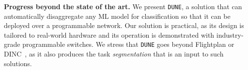 \documentclass[journal]{IEEEtran}
\theoremstyle{plain} %
\newcommand{\eg}{\textit{e.g.},\xspace}
\newcommand{\name}{\texttt{\fontsize{9}{11}\selectfont DUNE}\xspace}
\begin{document}
\noindent\textbf{Progress beyond the state of the art.}
We present \name, a solution that can automatically disaggregate any ML model for classification so that it can be deployed over a programmable network. Our solution is practical, as its design is tailored to real-world hardware and its operation is demonstrated with industry-grade programmable switches. We stress that \name goes beyond Flightplan \cite{sultana_flightplan_2021} or DINC~\cite{dinc-conext23}, as it also
produces the task \textit{segmentation} that is an input to such solutions.





\end{document}
